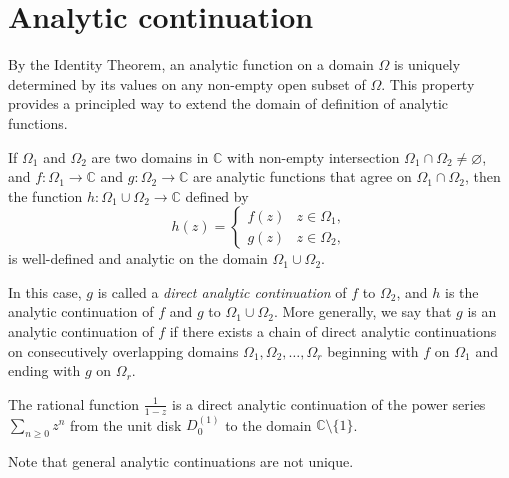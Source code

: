 
\section*{Analytic continuation}

By the Identity Theorem, an analytic function on a domain \(\Omega\) is uniquely determined by its values on any non-empty open subset of \(\Omega\). This property provides a principled way to extend the domain of definition of analytic functions.

If \(\Omega_1\) and \(\Omega_2\) are two domains in \(\mathbb{C}\) with non-empty intersection \(\Omega_1 \cap \Omega_2 \neq \varnothing\), and 
\(f \colon \Omega_1 \to \mathbb{C}\) and \(g \colon \Omega_2 \to \mathbb{C}\) are analytic functions that agree on \(\Omega_1 \cap \Omega_2\), then the function \(h \colon \Omega_1 \cup \Omega_2 \to \mathbb{C}\) defined by
\[
    h(z) = \begin{cases}
        f(z) & z \in \Omega_1, \\
        g(z) & z \in \Omega_2,
    \end{cases}
\]
is well-defined and analytic on the domain \(\Omega_1 \cup \Omega_2\).

In this case, \(g\) is called a \emph{direct analytic continuation} of \(f\) to \(\Omega_2\), and \(h\) is the analytic continuation of \(f\) and \(g\) to \(\Omega_1 \cup \Omega_2\).
More generally, we say that \(g\) is an analytic continuation of \(f\) if there exists a chain of direct analytic continuations on consecutively overlapping domains \(\Omega_1, \Omega_2, \dots, \Omega_r\) beginning with \(f\) on \(\Omega_1\) and ending with \(g\) on \(\Omega_r\).

\begin{example}
    The rational function \(\frac{1}{1-z}\) is a direct analytic continuation of the power series \(\sum_{n \ge 0} z^n\) from the unit disk \(D_0^{(1)}\) to the domain \(\mathbb{C} \setminus \{1\}\).
\end{example}

Note that general analytic continuations are not unique.

\pagebreak

